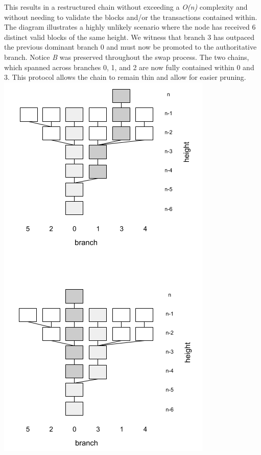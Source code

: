 \documentclass[10pt,twocolumn]{article}
\begin{document}
This results in a restructured chain without exceeding a \textit{O(n)} complexity and without needing to validate the blocks and/or the transactions contained within.  The diagram illustrates a highly unlikely scenario where the node has received 6 distinct valid blocks of the same height.  We witness that branch 3 has outpaced the previous dominant branch 0 and must now be promoted to the authoritative branch.  Notice \textit{B} was preserved throughout the swap process.  The two chains, which spanned across branches 0, 1, and 2 are now fully contained within 0 and 3.  This protocol allows the chain to remain thin and allow for easier pruning.
\includegraphics[width=1.00\linewidth]{branch_restructure3.png}
\end{document}
